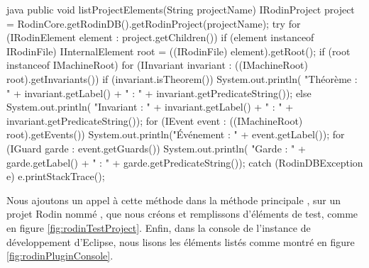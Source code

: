 \begin{imtaCode}{java}
public void listProjectElements(String projectName)
{
    IRodinProject project = RodinCore.getRodinDB().getRodinProject(projectName);
        try
        {
            for (IRodinElement element : project.getChildren())
            {
                if (element instanceof IRodinFile)
                {
                    IInternalElement root = ((IRodinFile) element).getRoot();
                    if (root instanceof IMachineRoot)
                    {
                        for (IInvariant invariant : 
                             ((IMachineRoot) root).getInvariants())
                        {
                            if (invariant.isTheorem())
                            {
                                System.out.println(
                                    "Théorème : " + invariant.getLabel() + " : "
                                    + invariant.getPredicateString());
                            }
                            else
                            {
                                System.out.println(
                                    "Invariant : " + invariant.getLabel() + " : "
                                    + invariant.getPredicateString());
                            }
                        }
                        for (IEvent event : ((IMachineRoot) root).getEvents())
                        {
                            System.out.println("Événement : " + event.getLabel());
                            for (IGuard garde : event.getGuards())
                            {
                                System.out.println(
                                    "Garde : " + garde.getLabel() + " : " 
                                    + garde.getPredicateString());
                            }
                        }
                    }
                }
            }
        } catch (RodinDBException e) {
        e.printStackTrace();
    }
}
\end{imtaCode}

Nous ajoutons un appel à cette méthode dans la méthode principale , sur un projet Rodin nommé , %
que nous créons et remplissons d'éléments de test, comme en figure \ref{fig:rodinTestProject}.
Enfin, dans la console de l'instance de développement d'Eclipse, nous lisons les éléments listés comme montré en figure \ref{fig:rodinPluginConsole}.

